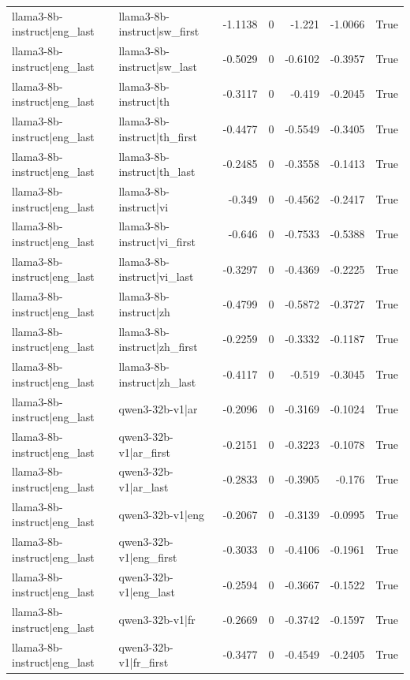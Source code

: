 \begin{table}
\begin{tabular}{l l r r r r l}
llama3-8b-instruct|eng_last & llama3-8b-instruct|sw_first & -1.1138 & 0 & -1.221 & -1.0066 & True \\
llama3-8b-instruct|eng_last & llama3-8b-instruct|sw_last & -0.5029 & 0 & -0.6102 & -0.3957 & True \\
llama3-8b-instruct|eng_last & llama3-8b-instruct|th & -0.3117 & 0 & -0.419 & -0.2045 & True \\
llama3-8b-instruct|eng_last & llama3-8b-instruct|th_first & -0.4477 & 0 & -0.5549 & -0.3405 & True \\
llama3-8b-instruct|eng_last & llama3-8b-instruct|th_last & -0.2485 & 0 & -0.3558 & -0.1413 & True \\
llama3-8b-instruct|eng_last & llama3-8b-instruct|vi & -0.349 & 0 & -0.4562 & -0.2417 & True \\
llama3-8b-instruct|eng_last & llama3-8b-instruct|vi_first & -0.646 & 0 & -0.7533 & -0.5388 & True \\
llama3-8b-instruct|eng_last & llama3-8b-instruct|vi_last & -0.3297 & 0 & -0.4369 & -0.2225 & True \\
llama3-8b-instruct|eng_last & llama3-8b-instruct|zh & -0.4799 & 0 & -0.5872 & -0.3727 & True \\
llama3-8b-instruct|eng_last & llama3-8b-instruct|zh_first & -0.2259 & 0 & -0.3332 & -0.1187 & True \\
llama3-8b-instruct|eng_last & llama3-8b-instruct|zh_last & -0.4117 & 0 & -0.519 & -0.3045 & True \\
llama3-8b-instruct|eng_last & qwen3-32b-v1|ar & -0.2096 & 0 & -0.3169 & -0.1024 & True \\
llama3-8b-instruct|eng_last & qwen3-32b-v1|ar_first & -0.2151 & 0 & -0.3223 & -0.1078 & True \\
llama3-8b-instruct|eng_last & qwen3-32b-v1|ar_last & -0.2833 & 0 & -0.3905 & -0.176 & True \\
llama3-8b-instruct|eng_last & qwen3-32b-v1|eng & -0.2067 & 0 & -0.3139 & -0.0995 & True \\
llama3-8b-instruct|eng_last & qwen3-32b-v1|eng_first & -0.3033 & 0 & -0.4106 & -0.1961 & True \\
llama3-8b-instruct|eng_last & qwen3-32b-v1|eng_last & -0.2594 & 0 & -0.3667 & -0.1522 & True \\
llama3-8b-instruct|eng_last & qwen3-32b-v1|fr & -0.2669 & 0 & -0.3742 & -0.1597 & True \\
llama3-8b-instruct|eng_last & qwen3-32b-v1|fr_first & -0.3477 & 0 & -0.4549 & -0.2405 & True \\

\end{tabular}
\end{table}
